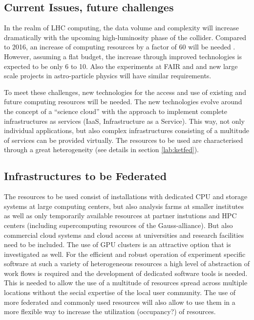 \subsection{Current Issues, future challenges}
In the realm of LHC computing, the data volume and complexity will
increase dramatically with the upcoming high-luminosity phase of the
collider. Compared to 2016, an increase of computing resources by a
factor of 60 will be needed . However, assuming a flat budget, the
increase through improved technologies is expected to be only 6 to 10. Also the
experiments at FAIR and and new large scale projects in astro-particle
physics will have similar requirements. 

To meet these challenges, new technologies for the access and use of
existing and future computing resources will be needed. The new
technologies evolve around the concept of a ``science cloud'' with the
approach to implement complete infrastructures as services (IaaS,
Infrastructure as a Service). This way, not only individual
applications, but also complex infrastructures consisting of a
multitude of services can be provided virtually. The resources to be
used are characterised through a great heterogeneity (see details in section
\ref{lab:ketfed}). 

\subsection{Infrastructures to be Federated \label{lab:ketfed} }
The resources to be used consist of installations with dedicated CPU
and storage systems at large computing centers, but also analysis
farms at smaller institutes as well as only temporarily available
resources at partner instutions and HPC centers (including
supercomputing resources of the Gauss-alliance). But also commercial
cloud systems and cloud access at universities and research facilities
need to be included. The use of GPU clusters is an attractive option
that is investigated as well. For the efficient and robust operation
of experiment specific software at such a variety of heterogeneous
resources a high level of abstraction of work flows is required and
the development of dedicated software tools is needed. This is needed
to allow the use of a multitude of resources spread across multiple
locations without the secial expertise of the local user
community. The use of more federated and commonly used resources will
also allow to use them in a more flexible way to increase the
utilization (occupancy?) of resources. 

